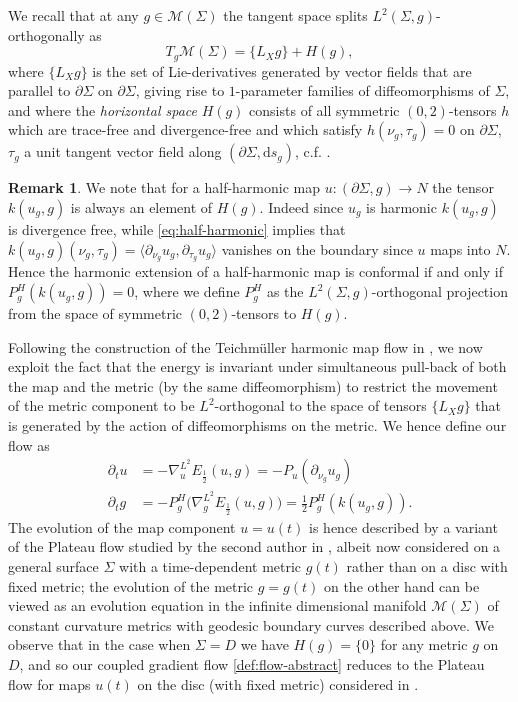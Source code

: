 \documentclass[10pt,reqno]{amsart}
\theoremstyle{plain}
\theoremstyle{definition}
\newcommand{\pnug}{\partial_{\nu_g}}
\newtheorem{rmk}[lemma]{Remark}
\numberwithin{equation}{section}
\newcommand{\Si}{\Sigma}
\newcommand{\beq}{\begin{equation}}
\newcommand{\eeq}{\end{equation}}
\newcommand{\beqa}{\begin{equation}\begin{aligned}}
\newcommand{\eeqa}{\end{aligned}\end{equation}}
\newcommand{\half}{\frac{1}{2}}
\newcommand{\dd}{\mathrm{d}} %
\newcommand{\M}{\ensuremath{{\mathcal M}}}
\newcommand{\na}{\nabla}
\newcommand{\pSi}{{\partial \Sigma}}
\newcommand{\MM}{\mathcal{M}} %
\newcommand{\png}{{\partial_{\nu_g}}}
\newcommand{\ptaug}{{\partial_{\tau_g}}}
\newcommand{\p}{\partial} %
\newcommand{\inner}[2]{\langle #1, #2\rangle} %
\begin{document}
We recall that at any $g\in\MM(\Si)$ the tangent space splits $L^2(\Si,g)$-orthogonally as 
\beq\label{eq:split}
    T_{g}\MM(\Si)=\{L_X g\}+H(g),
\eeq
where $\{L_X g\}$ is the set of Lie-derivatives generated by vector fields that are parallel to $\pSi$ on $\pSi$, giving rise to $1$-parameter families of diffeomorphisms of $\Si$, and where the  \textit{horizontal space} $H(g)$ consists of all symmetric $(0,2)$-tensors $h$ which are trace-free and divergence-free and which satisfy $h(\nu_g,\tau_g)=0$ on $\partial \Si$,  $\tau_g$ a unit tangent vector field along $(\pSi,\dd s_g)$, c.f. \cite{Tromba}.
 

\begin{rmk}\label{rmk:conformal}
    We note that for a half-harmonic map $u:(\p\Si,g) \rightarrow N$ the tensor $k(u_g,g)$ is always an element of $H(g)$. Indeed since $u_g$ is harmonic $k(u_g,g)$ is divergence free, while \eqref{eq:half-harmonic} implies that $k(u_g,g)(\nu_g,\tau_g)=\inner{\pnug u_g}{\ptaug u_g}$ vanishes on the boundary since $u$ maps into $N$. Hence the harmonic extension of a half-harmonic map is conformal if and only if $P_g^H(k(u_g,g)) = 0$, where we define $P_g^{H}$ as the $L^2(\Si,g)$-orthogonal projection from the space of symmetric $(0,2)$-tensors to $H(g)$. 
\end{rmk}

Following the construction of the Teichm\"uller harmonic map flow in \cite{Rupflin-Topping}, we now exploit the fact that the energy is invariant under simultaneous pull-back of both the map and the metric (by the same diffeomorphism) to restrict the movement of the metric component to be $L^2$-orthogonal to the space of tensors $\{L_X g\}$ that is generated by the action of diffeomorphisms on the metric. We hence define our flow as 
\beqa\label{def:flow-abstract}
    \partial_t u&= -\na^{L^2}_{u} E_\half(u,g)= -P_u(\png u_g)\\
    \partial_t g&=-P_g^{H}\big(\na_g^{L^2} E_\half(u,g)\big)=\half  P^H_g(k(u_g,g)).
\eeqa
%
The evolution of the map component $u=u(t)$ is hence described by a variant of the Plateau flow 
studied by the second author in \cite{S}, albeit now considered on a general surface $\Si$ with a time-dependent metric $g(t)$ rather than on a disc with fixed metric; the evolution of the metric $g=g(t)$ on the other hand can be viewed as an evolution equation in the infinite dimensional manifold $\M(\Si)$ of constant curvature metrics with geodesic boundary curves described above. We observe that in the case when $\Si=D$ we have $H(g)=\{0\}$ for any metric $g$ on $D$, and so our coupled gradient flow \eqref{def:flow-abstract} reduces to the Plateau flow for maps $u(t)$ on the disc (with fixed metric) considered in \cite{S}.
\end{document}
